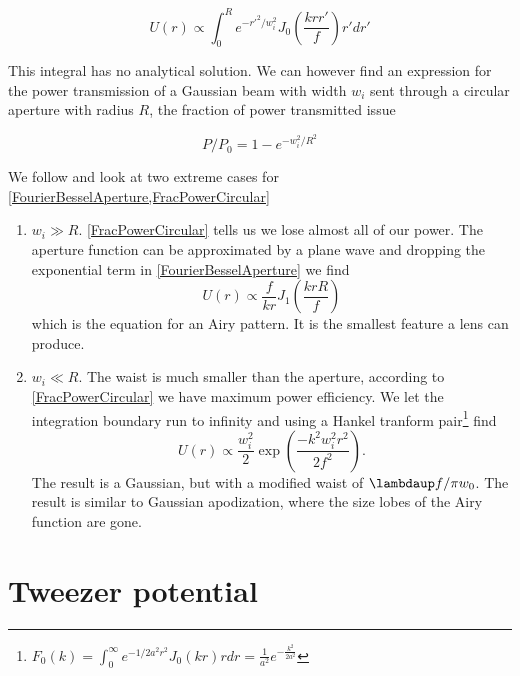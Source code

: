 \begin{equation}\label{FourierBesselAperture}
    U(r) \propto \int_0^R e^{-r'^2/w_i^2} J_0\left(\frac{k r r'}{f}\right)r'dr'
\end{equation}

This integral has no analytical solution. We can however find an expression for the power transmission of a Gaussian beam with width $w_i$ sent through a circular aperture with radius $R$, the fraction of power transmitted issue

\begin{equation}\label{FracPowerCircular}
    P/P_0 = 1 - e^{-w_i^2/R^2}
\end{equation}

We follow \cite{Madjarov2021} and look at two extreme cases for \cref{FourierBesselAperture,FracPowerCircular}

\begin{enumerate}
    \item $w_i \gg R$. \cref{FracPowerCircular} tells us we lose almost all of our power. The aperture function can be approximated by a plane wave and dropping the exponential term in \cref{FourierBesselAperture} we find
    \begin{equation}\label{Airy}
        U(r) \propto \frac{f}{k r} J_1\left(\frac{k r R}{f}\right)
    \end{equation}
    which is the equation for an Airy pattern. It is the smallest feature a lens can produce. 

    \item $w_i \ll R$. The waist is much smaller than the aperture, according to \cref{FracPowerCircular} we have maximum power efficiency. We let the integration boundary run to infinity and using a Hankel tranform pair\footnote{$F_0(k) = \int_0^{\infty} e^{-1/2 a^2 r^2} J_0(k r)r dr = \frac{1}{a^2} e^{-\frac{k^2}{2a^2}}$} find 
        \begin{equation}
        U(r) \propto \frac{w_i^2}{2} \exp{\left(\frac{-k^2w_i^2 r^2}{2f^2}\right)}.
    \end{equation}
    The result is a Gaussian, but with a modified waist of $\lambdaup f / \pi w_0$.  The result is similar to Gaussian apodization, where the size lobes of the Airy function are gone. 
\end{enumerate}

\section{Tweezer potential}

